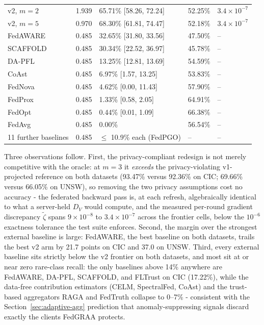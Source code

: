 \documentclass[11pt,a4paper]{report}
\begin{document}
\begin{table}[htbp]
\begin{tabular}{@{}lllll@{}}
    v2, $m=2$ & 1.939 & 65.71\% [58.26, 72.24] & 52.25\% & $3.4{\times}10^{-7}$ \\
    v2, $m=5$ & 0.970 & 68.30\% [61.81, 74.47] & 52.18\% & $3.4{\times}10^{-7}$ \\
    FedAWARE & 0.485 & 32.65\% [31.80, 33.56] & 47.50\% & -- \\
    SCAFFOLD & 0.485 & 30.34\% [22.52, 36.97] & 45.78\% & -- \\
    DA-PFL & 0.485 & 13.25\% [12.81, 13.69] & 54.59\% & -- \\
    CoAst & 0.485 & 6.97\% [1.57, 13.25] & 53.83\% & -- \\
    FedNova & 0.485 & 4.62\% [0.00, 11.43] & 57.90\% & -- \\
    FedProx & 0.485 & 1.33\% [0.58, 2.05] & 64.91\% & -- \\
    FedOpt & 0.485 & 0.44\% [0.01, 1.09] & 66.38\% & -- \\
    FedAvg & 0.485 & 0.00\% & 56.54\% & -- \\
    11 further baselines & 0.485 & $\le$ 10.9\% each (FedPGO) & -- & -- \\
    \bottomrule
  \end{tabular}
\end{table}

Three observations follow. First, the privacy-compliant redesign is not
merely competitive with the oracle: at $m = 3$ it \emph{exceeds} the
privacy-violating v1-projected reference on both datasets (93.47\% versus
92.36\% on CIC; 69.66\% versus 66.05\% on UNSW), so removing the two
privacy assumptions cost no accuracy - the federated backward pass is, at
each refresh, algebraically identical to what a server-held $D_V$ would
compute, and the measured per-round gradient discrepancy $\tilde{\zeta}$
spans $9\times10^{-8}$ to $3.4\times10^{-7}$ across the frontier cells, below
the $10^{-6}$ exactness tolerance the test suite enforces. Second, the margin over the strongest external
baseline is large: FedAWARE, the best baseline on both datasets, trails the
best v2 arm by 21.7 points on CIC and 37.0 on UNSW. Third, every external
baseline sits strictly below the v2 frontier on both datasets, and most sit
at or near zero rare-class recall: the only baselines above 14\% anywhere
are FedAWARE, DA-PFL, SCAFFOLD, and FLTrust on CIC (17.22\%), while the
data-free contribution estimators (CELM, SpectralFed, CoAst) and the
trust-based aggregators RAGA and FedTruth collapse to 0--7\% - consistent
with the Section~\ref{sec:adaptive-agg} prediction that
anomaly-suppressing signals discard exactly the clients FedGRAA protects.
\end{document}
